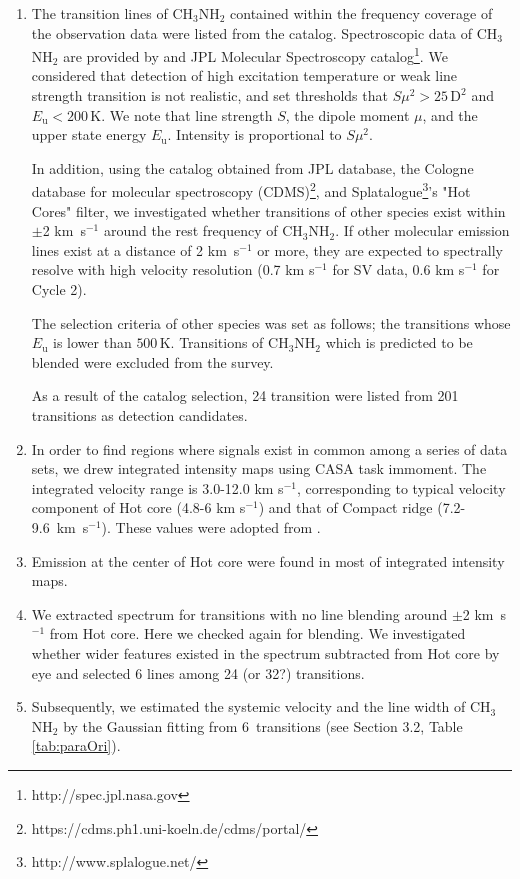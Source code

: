 \begin{enumerate}
\item The transition lines of CH$_3$NH$_2$ contained within the frequency coverage of the observation data were listed from the catalog. Spectroscopic data of CH$_3$NH$_2$ are provided by \citet{Motiyenko+2014} and JPL Molecular Spectroscopy catalog\footnote{http://spec.jpl.nasa.gov}.
We considered that detection of high excitation temperature or weak line strength transition 
is not realistic, and set thresholds that $S\mu^2 > 25\,\mathrm{D^2}$ and $E_{\mathrm{u}} < 200 \,\mathrm{K}$. We note that line strength $S$, the dipole moment $\mu$, and the upper state energy 
$E_{\mathrm{u}}$. Intensity is proportional to $S\mu^2$.

In addition, using the catalog obtained from JPL database, the Cologne database for molecular 
spectroscopy (CDMS)\footnote{https://cdms.ph1.uni-koeln.de/cdms/portal/}, 
and Splatalogue\footnote{http://www.splalogue.net/}'s "Hot Cores" filter, 
we investigated whether transitions of other species exist within $\pm$2 km~s$^{-1}$  
around the rest frequency of CH$_3$NH$_2$. 
If other molecular emission lines exist at a distance of 2 km~s$^{-1}$ or more, they are expected to spectrally resolve with high velocity resolution (0.7 km s$^{-1}$ for SV data, 0.6 km s$^{-1}$ for Cycle 2).


The selection criteria of other species was set as follows; 
the transitions whose $E_{\mathrm{u}}$ is lower than $500\, \mathrm{K}$.
Transitions of CH$_3$NH$_2$ which is predicted to be blended were excluded from the survey.

As a result of the catalog selection, 24 transition were listed from 201 transitions as detection candidates.

\item In order to find regions where signals exist in common among a series of data sets, 
we drew integrated intensity maps 
using CASA task {\sc immoment}. The integrated velocity range is 3.0-12.0 km s$^{-1}$, corresponding to
typical velocity component of Hot core (4.8-6 km s$^{-1}$) and that of Compact ridge 
(7.2-9.6~km~s$^{-1}$). These values were adopted from \citet{Feng+2015}.

\item Emission at the center of Hot core were found in most of integrated intensity maps. 

\item We extracted spectrum for transitions with no line blending around $\pm$2 km~s$^{-1}$ from Hot core. Here we checked again for blending. We investigated whether wider features existed 
in the spectrum subtracted from Hot core by eye and selected 6 lines among 24 (or 32?) transitions.

\item Subsequently, we estimated the systemic velocity and the line width of CH$_3$NH$_2$ 
by the Gaussian fitting from 6~transitions (see Section 3.2, Table \ref{tab:paraOri}).
\end{enumerate}
